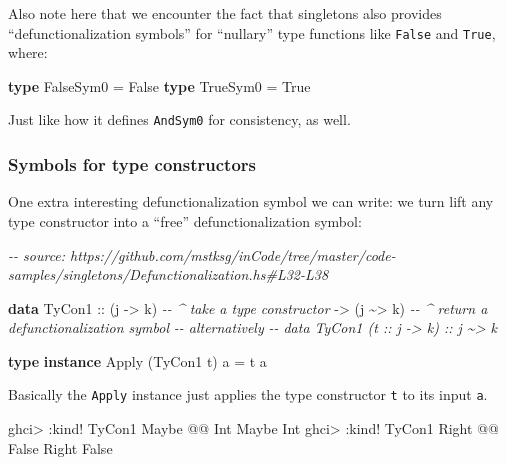 \documentclass[]{article}
\newenvironment{Shaded}{}{}
\newcommand{\CommentTok}[1]{\textcolor[rgb]{0.38,0.63,0.69}{\textit{#1}}}
\newcommand{\DataTypeTok}[1]{\textcolor[rgb]{0.56,0.13,0.00}{#1}}
\newcommand{\KeywordTok}[1]{\textcolor[rgb]{0.00,0.44,0.13}{\textbf{#1}}}
\newcommand{\NormalTok}[1]{#1}
\newcommand{\OperatorTok}[1]{\textcolor[rgb]{0.40,0.40,0.40}{#1}}
\newcommand{\OtherTok}[1]{\textcolor[rgb]{0.00,0.44,0.13}{#1}}
\begin{document}
Also note here that we encounter the fact that singletons also provides
``defunctionalization symbols'' for ``nullary'' type functions like
\texttt{False} and \texttt{True}, where:

\begin{Shaded}
\begin{Highlighting}[]
\KeywordTok{type} \DataTypeTok{FalseSym0} \OtherTok{=} \DataTypeTok{\textquotesingle{}False}
\KeywordTok{type} \DataTypeTok{TrueSym0}  \OtherTok{=} \DataTypeTok{\textquotesingle{}True}
\end{Highlighting}
\end{Shaded}

Just like how it defines \texttt{AndSym0} for consistency, as well.

\subsubsection{Symbols for type
constructors}\label{symbols-for-type-constructors}

One extra interesting defunctionalization symbol we can write: we turn lift any
type constructor into a ``free'' defunctionalization symbol:

\begin{Shaded}
\begin{Highlighting}[]
\CommentTok{{-}{-} source: https://github.com/mstksg/inCode/tree/master/code{-}samples/singletons/Defunctionalization.hs\#L32{-}L38}

\KeywordTok{data} \DataTypeTok{TyCon1}
\OtherTok{        ::}\NormalTok{ (j }\OtherTok{{-}\textgreater{}}\NormalTok{ k)     }\CommentTok{{-}{-} \^{} take a type constructor}
        \OtherTok{{-}\textgreater{}}\NormalTok{ (j }\OperatorTok{\textasciitilde{}\textgreater{}}\NormalTok{ k)     }\CommentTok{{-}{-} \^{} return a defunctionalization symbol}
\CommentTok{{-}{-} alternatively}
\CommentTok{{-}{-} data TyCon1 (t :: j {-}\textgreater{} k) :: j \textasciitilde{}\textgreater{} k}

\KeywordTok{type} \KeywordTok{instance} \DataTypeTok{Apply}\NormalTok{ (}\DataTypeTok{TyCon1}\NormalTok{ t) a }\OtherTok{=}\NormalTok{ t a}
\end{Highlighting}
\end{Shaded}

Basically the \texttt{Apply} instance just applies the type constructor
\texttt{t} to its input \texttt{a}.

\begin{Shaded}
\begin{Highlighting}[]
\NormalTok{ghci}\OperatorTok{\textgreater{}} \OperatorTok{:}\NormalTok{kind}\OperatorTok{!} \DataTypeTok{TyCon1} \DataTypeTok{Maybe} \OperatorTok{@@} \DataTypeTok{Int}
\DataTypeTok{Maybe} \DataTypeTok{Int}
\NormalTok{ghci}\OperatorTok{\textgreater{}} \OperatorTok{:}\NormalTok{kind}\OperatorTok{!} \DataTypeTok{TyCon1} \DataTypeTok{\textquotesingle{}Right} \OperatorTok{@@} \DataTypeTok{\textquotesingle{}False}
\DataTypeTok{\textquotesingle{}Right} \DataTypeTok{\textquotesingle{}False}
\end{Highlighting}
\end{Shaded}
\end{document}
